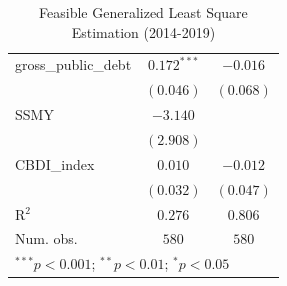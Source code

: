 \begin{table} [t]
\begin{minipage}{0.5\textwidth}
{\begin{tabular}{l c c}
gross\_public\_debt & $0.172^{***}$  & $-0.016$     \\
                    & $(0.046)$      & $(0.068)$    \\
SSMY                & $-3.140$       &              \\
                    & $(2.908)$      &              \\
CBDI\_index         & $0.010$        & $-0.012$     \\
                    & $(0.032)$      & $(0.047)$    \\
\hline
R$^2$               & $0.276$        & $0.806$      \\
Num. obs.           & $580$          & $580$        \\
\hline
\multicolumn{3}{l}{\scriptsize{$^{***}p<0.001$; $^{**}p<0.01$; $^{*}p<0.05$}}
\end{tabular}}
\end{minipage}

\caption{Feasible Generalized Least Square Estimation (2014-2019)}
\label{FGLS}
\end{table}

